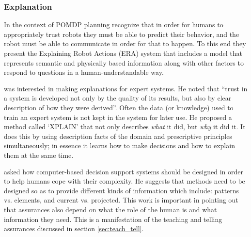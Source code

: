 %

\subsubsection{Explanation}
    In the context of POMDP planning \citet{Lomas2012-ie} recognize that in order for humans to appropriately trust robots they must be able to predict their behavior, and the robot must be able to communicate in order for that to happen. To this end they present the Explaining Robot Actions (ERA) system that includes a model that represents semantic and physically based information along with other factors to respond to questions in a human-understandable way.

    \citet{Swartout1983-ko} was interested in making explanations for expert systems. He noted that ``trust in a system is developed not only by the quality of its results, but also by clear description of how they were derived''. Often the data (or knowledge) used to train an expert system is not kept in the system for later use. He proposed a method called `XPLAIN' that not only describes \emph{what} it did, but \emph{why} it did it. It does this by using description facts of the domain and prescriptive principles simultaneously; in essence it learns how to make decisions and how to explain them at the same time.

    \citet{Rouse1986-dz} asked how computer-based decision support systems should be designed in order to help humans cope with their complexity. He suggests that methods need to be designed so as to provide different kinds of information which include: patterns vs. elements, and current vs. projected. This work is important in pointing out that assurances also depend on what the role of the human is and what information they need. This is a manifestation of the teaching and telling assurances discussed in section \ref{sec:teach_tell}.

